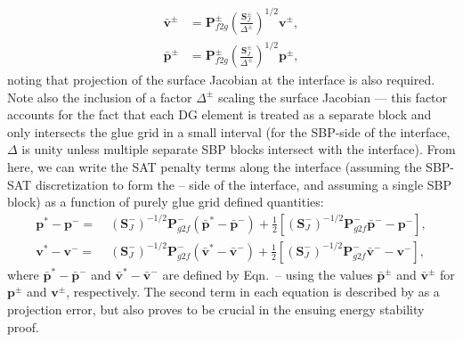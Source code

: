 \begin{align}
  \pmb{\bar{v}}^{\pm} &= \pmb{P}_{f2g}^{\pm} {\left(\frac{\pmb{S}_{J}^{\pm}}{\Delta^{\pm}}\right)}^{1/2} \pmb{v}^{\pm},\\
  \pmb{\bar{p}}^{\pm} &= \pmb{P}_{f2g}^{\pm} {\left(\frac{\pmb{S}_{J}^{\pm}}{\Delta^{\pm}}\right)}^{1/2} \pmb{p}^{\pm},
\end{align}
noting that projection of the surface Jacobian at the interface is also required.
Note also the inclusion of a factor $\Delta^{\pm}$ scaling the surface Jacobian --- this
factor accounts for the fact that each DG element is treated as a separate block and
only intersects the glue grid in a small interval (for the SBP-side of the interface, $\Delta$
is unity unless multiple separate SBP blocks intersect with the interface). From here,
we can write the SAT penalty terms along the interface (assuming the
SBP-SAT discretization to form the -- side of the interface, and assuming a single SBP
block) as a function of purely glue grid defined quantities:
\begin{align}
  \label{eqn:pen:noncon:v}
  \pmb{p}^{*} - \pmb{p}^{-} =\;&
  {\left(\pmb{S}_{J}^{-}\right)}^{-1/2} \pmb{P}^{-}_{g2f}
  \left(\pmb{\bar{p}}^{*} - \pmb{\bar{p}}^{-}\right)
  +\frac{1}{2}\left[
    {\left(\pmb{S}_{J}^{-}\right)}^{-1/2} \pmb{P}^{-}_{g2f}\pmb{\bar{p}}^{-}
    - \pmb{p}^{-}
  \right],\\
  \label{eqn:pen:noncon:p}
  \pmb{v}^{*} - \pmb{v}^{-} =\;&
  {\left(\pmb{S}_{J}^{-}\right)}^{-1/2} \pmb{P}^{-}_{g2f}
  \left(\pmb{\bar{v}}^{*} - \pmb{\bar{v}}^{-}\right)
  +\frac{1}{2}\left[
    {\left(\pmb{S}_{J}^{-}\right)}^{-1/2} \pmb{P}^{-}_{g2f}\pmb{\bar{v}}^{-}
    - \pmb{v}^{-}
  \right],
\end{align}
where $\pmb{\bar{p}}^{*} - \pmb{\bar{p}}^{-}$ and $\pmb{\bar{v}}^{*} -
\pmb{\bar{v}}^{-}$ are defined by Eqn.~--
using the values $\pmb{\bar{p}}^{\pm}$ and $\pmb{\bar{v}}^{\pm}$ for
$\pmb{p}^{\pm}$ and $\pmb{v}^{\pm}$, respectively. The second term in each equation
is described by \cite{kozdon2016stable} as a projection error, but also proves to be
crucial in the ensuing energy stability proof.

